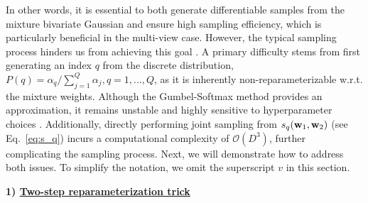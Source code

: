 In other words, it is essential to both generate differentiable samples from the mixture bivariate Gaussian and ensure high sampling efficiency, which is particularly beneficial in the multi-view case. However, the typical sampling process hinders us from achieving this goal \citep{mohamed2020monte, graves2016stochastic}. 
A primary difficulty stems from first generating an index $q$ from the discrete distribution, $P(q)\!=\!\alpha_q / \sum_{j=1}^{Q} \alpha_j, q\!=\!1, ..., Q$, as it is inherently non-reparameterizable w.r.t. the mixture weights. Although the Gumbel-Softmax method provides an approximation, it remains unstable and highly sensitive to hyperparameter choices \citep{potapczynski2020invertible}. Additionally, directly performing joint sampling from \( s_q({\mathbf w}_1, {\mathbf w}_2) \) (see Eq.~\eqref{eq:s_q}) incurs a computational complexity of \(\mathcal{O}(D^3)\), further complicating the sampling process.
Next, we will demonstrate how to address both issues. To simplify the notation, we omit the superscript $v$ in this section.

\vspace{0.1in}
\noindent \textbf{1) \underline{Two-step reparameterization trick}}  

